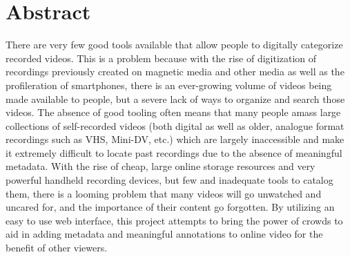 %
\chapter*{Abstract}
\label{sec:abstract}
\vspace*{-10mm}






There are very few good tools available that allow people to digitally categorize recorded videos.  This is a problem because with the rise of digitization of recordings previously created on magnetic media and other media as well as the profileration of smartphones, there is an ever-growing volume of videos being made available to people, but a severe lack of ways to organize and search those videos.  The absence of good tooling often means that many people amass large collections of self-recorded videos (both digital as well as older, analogue format recordings such as VHS, Mini-DV, etc.) which are largely inaccessible and make it extremely difficult to locate past recordings due to the absence of meaningful metadata.  With the rise of cheap, large online storage resources and very powerful handheld recording devices, but few and inadequate tools to catalog them, there is a looming problem that many videos will go unwatched and uncared for, and the importance of their content go forgotten. By utilizing an easy to use web interface, this project attempts to bring the power of crowds to aid in adding metadata and meaningful annotations to online video for the benefit of other viewers. 


